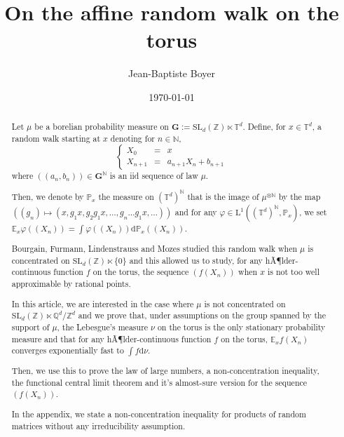 \documentclass[11pt]{amsart}
\theoremstyle{definition}
\theoremstyle{remark}
\numberwithin{equation}{section}
\begin{document}
\title{On the affine random walk on the torus}

\author{Jean-Baptiste Boyer}

\keywords{}

\date{\today}

\begin{abstract}
Let $\mu$ be a borelian probability measure on $\mathbf{G}:=\mathrm{SL}_d(\mathbb{Z}) \ltimes \mathbb{T}^d$. Define, for $x\in \mathbb{T}^d$, a random walk starting at $x$ denoting for $n\in \mathbb{N}$,
\[
\left\{\begin{array}{rcl}
X_0 &=&x\\
X_{n+1} &=& a_{n+1} X_n + b_{n+1}
\end{array}\right.
\]
where $((a_n,b_n))\in \mathbf{G}^\mathbb{N}$ is an iid sequence of law $\mu$.

Then, we denote by $\mathbb{P}_x$ the measure on $(\mathbb{T}^d)^\mathbb{N}$ that is the image of $\mu^{\otimes \mathbb{N}}$ by the map $\left((g_n) \mapsto (x,g_1 x, g_2 g_1 x, \dots , g_n \dots g_1 x, \dots)\right)$ and for any $\varphi \in \mathrm{L}^1((\mathbb{T}^d)^\mathbb{N}, \mathbb{P}_x)$, we set $\mathbb{E}_x \varphi((X_n)) = \int \varphi((X_n)) \mathrm{d}\mathbb{P}_x((X_n))$.

Bourgain, Furmann, Lindenstrauss and Mozes studied this random walk when $\mu$ is concentrated on $\mathrm{SL}_d(\mathbb{Z}) \ltimes\{0\}$ and this allowed us to study, for any hÃ¶lder-continuous function $f$ on the torus, the sequence $(f(X_n))$ when $x$ is not too well approximable by rational points.

In this article, we are interested in the case where $\mu$ is not concentrated on $\mathrm{SL}_d(\mathbb{Z}) \ltimes \mathbb{Q}^d/\mathbb{Z}^d$ and we prove that, under assumptions on the group spanned by the support of $\mu$, the Lebesgue's measure $\nu$ on the torus is the only stationary probability measure and that for any hÃ¶lder-continuous function $f$ on the torus, $\mathbb{E}_x f(X_n)$ converges exponentially fast to $\int f\mathrm{d}\nu$.

Then, we use this to prove the law of large numbers, a non-concentration inequality, the functional central limit theorem and it's almost-sure version for the sequence $(f(X_n))$.

\medskip
In the appendix, we state a non-concentration inequality for products of random matrices without any irreducibility assumption.
\end{abstract}
\end{document}
